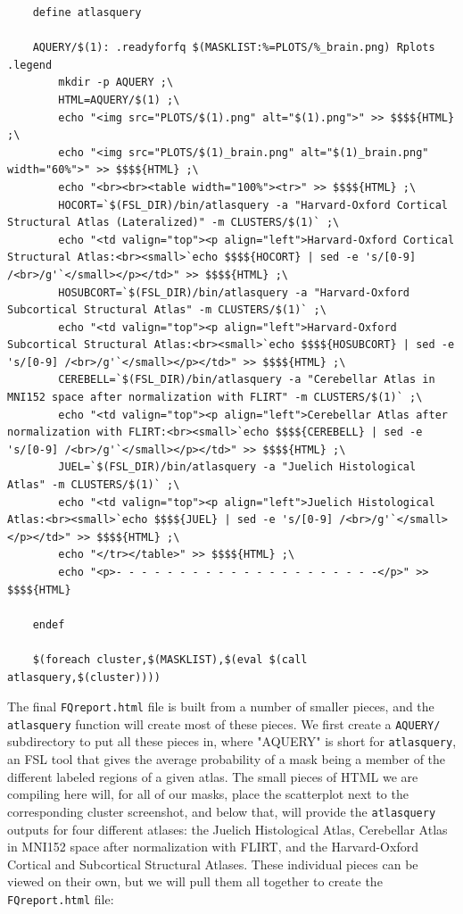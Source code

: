 \begin{lstlisting}
	define atlasquery
	
	AQUERY/$(1): .readyforfq $(MASKLIST:%=PLOTS/%_brain.png) Rplots .legend
		mkdir -p AQUERY ;\
		HTML=AQUERY/$(1) ;\
		echo "<img src="PLOTS/$(1).png" alt="$(1).png">" >> $$$${HTML} ;\
		echo "<img src="PLOTS/$(1)_brain.png" alt="$(1)_brain.png" width="60%">" >> $$$${HTML} ;\
		echo "<br><br><table width="100%"><tr>" >> $$$${HTML} ;\
		HOCORT=`$(FSL_DIR)/bin/atlasquery -a "Harvard-Oxford Cortical Structural Atlas (Lateralized)" -m CLUSTERS/$(1)` ;\
		echo "<td valign="top"><p align="left">Harvard-Oxford Cortical Structural Atlas:<br><small>`echo $$$${HOCORT} | sed -e 's/[0-9] /<br>/g'`</small></p></td>" >> $$$${HTML} ;\
		HOSUBCORT=`$(FSL_DIR)/bin/atlasquery -a "Harvard-Oxford Subcortical Structural Atlas" -m CLUSTERS/$(1)` ;\
		echo "<td valign="top"><p align="left">Harvard-Oxford Subcortical Structural Atlas:<br><small>`echo $$$${HOSUBCORT} | sed -e 's/[0-9] /<br>/g'`</small></p></td>" >> $$$${HTML} ;\
		CEREBELL=`$(FSL_DIR)/bin/atlasquery -a "Cerebellar Atlas in MNI152 space after normalization with FLIRT" -m CLUSTERS/$(1)` ;\
		echo "<td valign="top"><p align="left">Cerebellar Atlas after normalization with FLIRT:<br><small>`echo $$$${CEREBELL} | sed -e 's/[0-9] /<br>/g'`</small></p></td>" >> $$$${HTML} ;\
		JUEL=`$(FSL_DIR)/bin/atlasquery -a "Juelich Histological Atlas" -m CLUSTERS/$(1)` ;\
		echo "<td valign="top"><p align="left">Juelich Histological Atlas:<br><small>`echo $$$${JUEL} | sed -e 's/[0-9] /<br>/g'`</small></p></td>" >> $$$${HTML} ;\
		echo "</tr></table>" >> $$$${HTML} ;\
		echo "<p>- - - - - - - - - - - - - - - - - - - - -</p>" >> $$$${HTML}
				
	endef
	
	$(foreach cluster,$(MASKLIST),$(eval $(call atlasquery,$(cluster))))
\end{lstlisting}

The final \texttt{FQreport.html} file is built from a number of smaller pieces, and the \texttt{atlasquery} function will create most of these pieces. We first create a \texttt{AQUERY/} subdirectory to put all these pieces in, where "AQUERY" is short for \texttt{atlasquery}, an FSL tool that gives the average probability of a mask being a member of the different labeled regions of a given atlas. The small pieces of HTML we are compiling here will, for all of our masks, place the scatterplot next to the corresponding cluster screenshot, and below that, will provide the \texttt{atlasquery} outputs for four different atlases: the Juelich Histological Atlas, Cerebellar Atlas in MNI152 space after normalization with FLIRT, and the Harvard-Oxford Cortical and Subcortical Structural Atlases. These individual pieces can be viewed on their own, but we will pull them all together to create the \texttt{FQreport.html} file:


